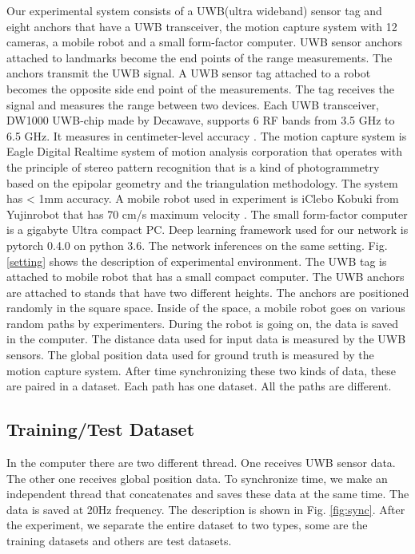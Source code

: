 \documentclass{ieeeaccess}
\begin{document}
Our experimental system consists of a UWB(ultra wideband) sensor tag and eight anchors that have a UWB transceiver, the motion capture system with 12 cameras, a mobile robot and a small form-factor computer. UWB sensor anchors attached to landmarks become the end points of the range measurements. The anchors transmit the UWB signal. A UWB sensor tag attached to a robot becomes the opposite side end point of the measurements. The tag receives the signal and measures the range between two devices. Each UWB transceiver, DW1000 UWB-chip made by Decawave, supports 6 RF bands from 3.5 GHz to 6.5 GHz. It measures in centimeter-level accuracy . The motion capture system is Eagle Digital Realtime system of motion analysis corporation that operates with the principle of stereo pattern recognition that is a kind of photogrammetry based on the epipolar geometry and the triangulation methodology. The system has < 1mm accuracy. A mobile robot used in experiment is iClebo Kobuki from Yujinrobot that has 70 cm/s maximum velocity . The small form-factor computer is a gigabyte Ultra compact PC. Deep learning framework used for our network is pytorch 0.4.0 on python 3.6. The network inferences on the same setting.
	Fig. \ref{setting} shows the description of experimental environment. The UWB tag is attached to mobile robot that has a small compact computer. The UWB anchors are attached to stands that have two different heights. The anchors are positioned randomly in the square space. Inside of the space, a mobile robot goes on various random paths by experimenters. During the robot is going on, the data is saved in the computer. The distance data used for input data is measured by the UWB sensors. The global position data used for ground truth is measured by the motion capture system. After time synchronizing these two kinds of data, these are paired in a dataset. Each path has one dataset. All the paths are different.

\subsection{Training/Test Dataset}

In the computer there are two different thread. One receives UWB sensor data. The other one receives global position data. To synchronize time, we make an independent thread that concatenates and saves these data at the same time. The data is saved at 20Hz frequency. The description is shown in Fig. \ref{fig:sync}. After the experiment, we separate the entire dataset to two types, some are the training datasets and others are test datasets.
\end{document}
